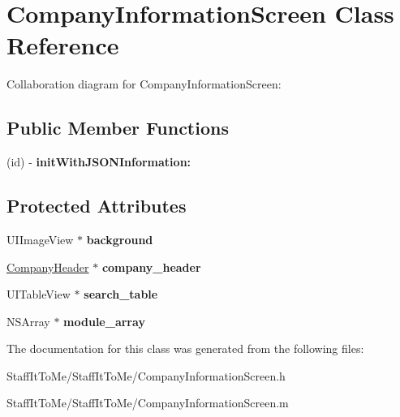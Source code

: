 \hypertarget{interface_company_information_screen}{
\section{\-Company\-Information\-Screen \-Class \-Reference}
\label{interface_company_information_screen}
}


\-Collaboration diagram for \-Company\-Information\-Screen\-:
\subsection*{\-Public \-Member \-Functions}
\begin{DoxyCompactItemize}
\item 
\hypertarget{interface_company_information_screen_a7244b48daeb617315f444d58e0478c9a}{
(id) -\/ {\bfseries init\-With\-J\-S\-O\-N\-Information\-:}}
\label{interface_company_information_screen_a7244b48daeb617315f444d58e0478c9a}

\end{DoxyCompactItemize}
\subsection*{\-Protected \-Attributes}
\begin{DoxyCompactItemize}
\item 
\hypertarget{interface_company_information_screen_ac27e108442f81f4c81dd86a6675762ea}{
\-U\-I\-Image\-View $\ast$ {\bfseries background}}
\label{interface_company_information_screen_ac27e108442f81f4c81dd86a6675762ea}

\item 
\hypertarget{interface_company_information_screen_ad0dded13b238372871b3e954e74367f6}{
\hyperlink{interface_company_header}{\-Company\-Header} $\ast$ {\bfseries company\-\_\-header}}
\label{interface_company_information_screen_ad0dded13b238372871b3e954e74367f6}

\item 
\hypertarget{interface_company_information_screen_a88543ca51fb34be7722047a6ea5d001c}{
\-U\-I\-Table\-View $\ast$ {\bfseries search\-\_\-table}}
\label{interface_company_information_screen_a88543ca51fb34be7722047a6ea5d001c}

\item 
\hypertarget{interface_company_information_screen_a882b8a7ec8876450c7e5ded46ce78d98}{
\-N\-S\-Array $\ast$ {\bfseries module\-\_\-array}}
\label{interface_company_information_screen_a882b8a7ec8876450c7e5ded46ce78d98}

\end{DoxyCompactItemize}


\-The documentation for this class was generated from the following files\-:\begin{DoxyCompactItemize}
\item 
\-Staff\-It\-To\-Me/\-Staff\-It\-To\-Me/\-Company\-Information\-Screen.\-h\item 
\-Staff\-It\-To\-Me/\-Staff\-It\-To\-Me/\-Company\-Information\-Screen.\-m\end{DoxyCompactItemize}
